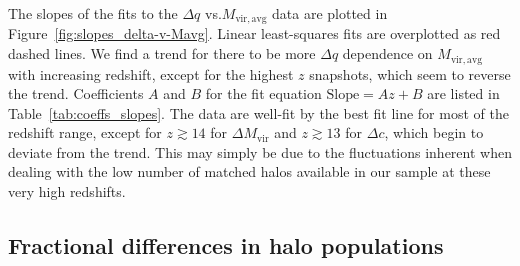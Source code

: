 The slopes of the fits to the $\Delta q$ vs.$M_{\mathrm{vir,avg}}$ data are plotted in Figure~\ref{fig:slopes_delta-v-Mavg}.  Linear least-squares fits are overplotted as red dashed lines.  We find a trend for there to be more $\Delta q$ dependence on $M_{\mathrm{vir,avg}}$ with increasing redshift, except for the highest $z$ snapshots, which seem to reverse the trend.  Coefficients $A$ and $B$ for the fit equation $\mathrm{Slope} = A z + B$ are listed in Table~\ref{tab:coeffs_slopes}.  The data are well-fit by the best fit line for most of the redshift range, except for $z \gtrsim 14$ for $\Delta M_{\mathrm{vir}}$ and $z \gtrsim 13$ for $\Delta c$, which begin to deviate from the trend.  This may simply be due to the fluctuations inherent when dealing with the low number of matched halos available in our sample at these very high redshifts.




\subsection{Fractional differences in halo populations}


